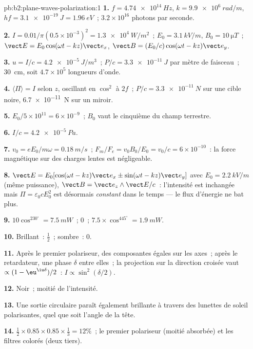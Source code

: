 \begin{solution}{pb:b2:plane-waves-polarization:1}
\textbf{1.} $f = \qty{4.74e14}{Hz}$, $k = \qty{9.9e6}{rad/m}$, $hf = \qty{3.1e-19}{J} =
\qty{1.96}{eV}$~; $3.2 \times 10^{16}$ photons par seconde.

\textbf{2.} $I = 0.01/\pi(0.5 \times 10^{-3})^2 = \qty{1.3e4}{W/m^2}$~; $E_0 = \qty{3.1}{kV/m}$,
$B_0 = \qty{10}{\micro T}$~; $\vect E = E_0\cos(\omega t - kz)\vect e_x$, $\vect B = (E_0/c)\cos(\omega t
- kz)\vect e_y$.

\textbf{3.} $u = I/c = \qty{4.2e-5}{J/m^3}$~; $P/c = \qty{3.3e-11}{J}$ par mètre de
faisceau~; \qty{30}{cm}, soit $4.7 \times 10^5$ longueurs d'onde.

\textbf{4.} $\langle\Pi\rangle = I$ selon $z$, oscillant en $\cos^2$ à $2f$~;
$P/c = \qty{3.3e-11}{N}$ sur une cible noire, \qty{6.7e-11}{N} sur un miroir.

\textbf{5.} $E_0/5 \times 10^{11} = 6 \times 10^{-9}$~; $B_0$ vaut le cinquième du champ
terrestre.

\textbf{6.} $I/c = \qty{4.2e-5}{Pa}$.

\textbf{7.} $v_0 = eE_0/m\omega = \qty{0.18}{m/s}$~; $F_m/F_e = v_0B_0/E_0 = v_0/c = 6 \times
10^{-10}$~: la force magnétique sur des charges lentes est négligeable.

\textbf{8.} $\vect E = E_0[\cos(\omega t - kz)\vect e_x \pm \sin(\omega t - kz)\vect e_y]$ avec
$E_0 = \qty{2.2}{kV/m}$ (même puissance), $\vect B = \vect e_z\wedge\vect E/c$~: l'intensité
est inchangée mais $\Pi = \varepsilon_0cE_0^2$ est désormais \emph{constant} dans le
temps --- le flux d'énergie ne bat plus.

\textbf{9.} $10\cos^230^\circ = \qty{7.5}{mW}$~; $0$~; $7.5 \times \cos^445^\circ = \qty{1.9}{mW}$.

\textbf{10.} Brillant~: $\tfrac12$~; sombre~: $0$.

\textbf{11.} Après le premier polariseur, des composantes égales sur les axes~;
après le retardateur, une phase $\delta$ entre elles~; la projection sur la direction
croisée vaut $\propto(1 - \eu^{\iu\delta})/2$~: $I \propto \sin^2(\delta/2)$.

\textbf{12.} Noir~; moitié de l'intensité.

\textbf{13.} Une sortie circulaire paraît également brillante à travers des lunettes
de soleil polarisantes, quel que soit l'angle de la tête.

\textbf{14.} $\tfrac12 \times 0.85 \times 0.85 \times \tfrac13 = 12\%$~; le premier polariseur
(moitié absorbée) et les filtres colorés (deux tiers).


\end{solution}
